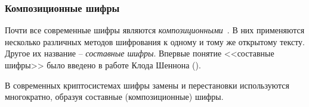 \subsubsection{Композиционные шифры}

Почти все современные шифры являются \emph{композиционными}~\cite{AlZKCh:2001}. В них применяются несколько различных методов шифрования к одному и тому же открытому тексту. Другое их название -- \emph{составные шифры}. Впервые понятие <<составные шифры>> было введено в работе Клода Шеннона ().

В современных криптосистемах шифры замены и перестановки используются многократно, образуя составные (композиционные) шифры.

